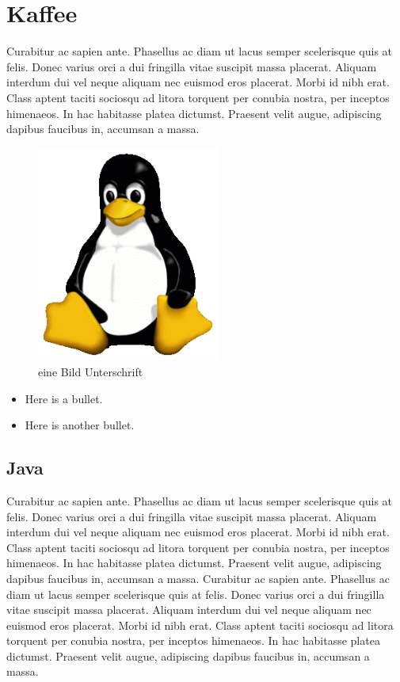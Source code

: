 \section{Kaffee}
Curabitur ac sapien ante. Phasellus ac diam ut lacus semper scelerisque quis at felis. Donec varius orci a dui fringilla vitae suscipit massa placerat. Aliquam interdum dui vel neque aliquam nec euismod eros placerat. Morbi id nibh erat. Class aptent taciti sociosqu ad litora torquent per conubia nostra, per inceptos himenaeos. In hac habitasse platea dictumst. Praesent velit augue, adipiscing dapibus faucibus in, accumsan a massa.
\begin{figure} \centering
  \includegraphics[width=6cm]{./img/tux.png}
  \caption{eine Bild Unterschrift}
  \label{tux3}
\end{figure}


\begin{itemize}

\item Here is a bullet.

\item Here is another bullet.

\end{itemize}


\subsection{Java} Curabitur ac sapien ante. Phasellus ac diam ut lacus semper scelerisque quis at felis. Donec varius orci a dui fringilla vitae suscipit massa placerat. Aliquam interdum dui vel neque aliquam nec euismod eros placerat. Morbi id nibh erat. Class aptent taciti sociosqu ad litora torquent per conubia nostra, per inceptos himenaeos. In hac habitasse platea dictumst. Praesent velit augue, adipiscing dapibus faucibus in, accumsan a massa.
Curabitur ac sapien ante. Phasellus ac diam ut lacus semper scelerisque quis at felis. Donec varius orci a dui fringilla vitae suscipit massa placerat. Aliquam interdum dui vel neque aliquam nec euismod eros placerat. Morbi id nibh erat. Class aptent taciti sociosqu ad litora torquent per conubia nostra, per inceptos himenaeos. In hac habitasse platea dictumst. Praesent velit augue, adipiscing dapibus faucibus in, accumsan a massa.



